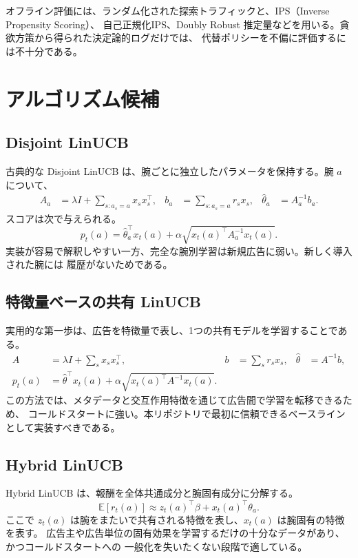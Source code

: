 \documentclass[uplatex,dvipdfmx,11pt,a4paper]{bxjsarticle}
\newcommand{\E}{\mathbb{E}}
\begin{document}
オフライン評価には、ランダム化された探索トラフィックと、IPS（Inverse Propensity Scoring）、
自己正規化IPS、Doubly Robust 推定量などを用いる。貪欲方策から得られた決定論的ログだけでは、
代替ポリシーを不偏に評価するには不十分である。

\section{アルゴリズム候補}
\subsection{Disjoint LinUCB}
古典的な Disjoint LinUCB は、腕ごとに独立したパラメータを保持する。腕 $a$ について、
\begin{align}
  A_a &= \lambda I + \sum_{s:a_s=a} x_s x_s^\top, &
  b_a &= \sum_{s:a_s=a} r_s x_s, &
  \hat\theta_a &= A_a^{-1}b_a.
\end{align}
スコアは次で与えられる。
\begin{equation}
  p_t(a)=\hat\theta_a^\top x_t(a)+\alpha\sqrt{x_t(a)^\top A_a^{-1}x_t(a)}.
\end{equation}
実装が容易で解釈しやすい一方、完全な腕別学習は新規広告に弱い。新しく導入された腕には
履歴がないためである。

\subsection{特徴量ベースの共有 LinUCB}
実用的な第一歩は、広告を特徴量で表し、1つの共有モデルを学習することである。
\begin{align}
  A &= \lambda I + \sum_s x_s x_s^\top, &
  b &= \sum_s r_s x_s, &
  \hat\theta &= A^{-1}b,\\
  p_t(a)&=\hat\theta^\top x_t(a)+\alpha\sqrt{x_t(a)^\top A^{-1}x_t(a)}.
\end{align}
この方法では、メタデータと交互作用特徴を通じて広告間で学習を転移できるため、
コールドスタートに強い。本リポジトリで最初に信頼できるベースラインとして実装すべきである。

\subsection{Hybrid LinUCB}
Hybrid LinUCB は、報酬を全体共通成分と腕固有成分に分解する。
\begin{equation}
  \E[r_t(a)] \approx z_t(a)^\top\beta + x_t(a)^\top\theta_a.
\end{equation}
ここで $z_t(a)$ は腕をまたいで共有される特徴を表し、$x_t(a)$ は腕固有の特徴を表す。
広告主や広告単位の固有効果を学習するだけの十分なデータがあり、かつコールドスタートへの
一般化を失いたくない段階で適している。
\end{document}

